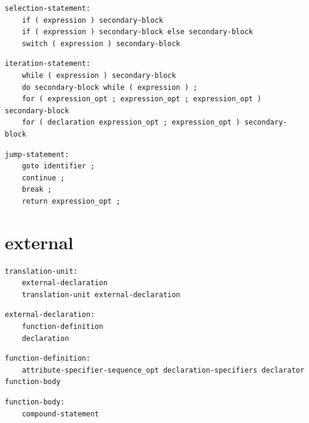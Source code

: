 \noindent\textbf{\texttt{}}\par
\begin{lstlisting}
selection-statement:
    if ( expression ) secondary-block
    if ( expression ) secondary-block else secondary-block
    switch ( expression ) secondary-block
\end{lstlisting}

\noindent\textbf{\texttt{}}\par
\begin{lstlisting}
iteration-statement:
    while ( expression ) secondary-block
    do secondary-block while ( expression ) ;
    for ( expression_opt ; expression_opt ; expression_opt ) secondary-block
    for ( declaration expression_opt ; expression_opt ) secondary-block
\end{lstlisting}

\noindent\textbf{\texttt{}}\par
\begin{lstlisting}
jump-statement:
    goto identifier ;
    continue ;
    break ;
    return expression_opt ;
\end{lstlisting}

\section{external}

\noindent\textbf{\texttt{}}\par
\begin{lstlisting}
translation-unit:
    external-declaration
    translation-unit external-declaration
\end{lstlisting}

\noindent\textbf{\texttt{}}\par
\begin{lstlisting}
external-declaration:
    function-definition
    declaration
\end{lstlisting}

\noindent\textbf{\texttt{}}\par
\begin{lstlisting}
function-definition:
    attribute-specifier-sequence_opt declaration-specifiers declarator function-body
\end{lstlisting}

\noindent\textbf{\texttt{}}\par
\begin{lstlisting}
function-body:
    compound-statement
\end{lstlisting}

